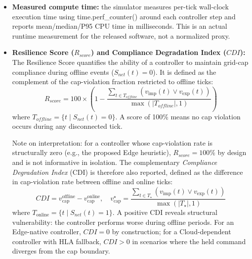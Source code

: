 \documentclass[preprint,12pt]{elsarticle}
\def\texttt#1{#1}%
\begin{document}
\begin{itemize}
\item \textbf{Measured compute time:} the simulator measures per-tick wall-clock execution time using \texttt{time.perf\_counter()} around each controller step and reports mean/median/P95 CPU time in milliseconds. This is an actual runtime measurement for the released software, not a normalized proxy.

\item \textbf{Resilience Score ($R_{score}$) and Compliance Degradation Index ($CDI$):}
The Resilience Score quantifies the ability of a controller to maintain grid-cap compliance during offline events ($S_{net}(t) = 0$). It is defined as the complement of the cap-violation fraction restricted to offline ticks:
\begin{equation}
R_{score} = 100 \times \left(1 - \frac{\sum_{t \in T_{offline}} (v_{\mathrm{imp}}(t) \lor v_{\mathrm{exp}}(t))}{\max(|T_{offline}|,1)}\right)
\label{eq:resilience_score}
\end{equation}
where $T_{offline} = \{t \mid S_{net}(t) = 0\}$. A score of 100\% means no cap violation occurs during any disconnected tick.

Note on interpretation: for a controller whose cap-violation rate is structurally zero (e.g., the proposed Edge heuristic), $R_{score}=100\%$ by design and is not informative in isolation. The complementary \emph{Compliance Degradation Index} (CDI) is therefore also reported, defined as the difference in cap-violation rate between offline and online ticks:
\begin{equation}
CDI = v_{\mathrm{cap}}^{\mathrm{offline}} - v_{\mathrm{cap}}^{\mathrm{online}},
\quad v_{\mathrm{cap}}^{\star} = \frac{\sum_{t\in T_{\star}} (v_{\mathrm{imp}}(t)\lor v_{\mathrm{exp}}(t))}{\max(|T_{\star}|,1)}
\label{eq:cdi}
\end{equation}
where $T_{\mathrm{online}}=\{t\mid S_{net}(t)=1\}$. A positive CDI reveals structural vulnerability: the controller performs worse during offline periods. For an Edge-native controller, $CDI=0$ by construction; for a Cloud-dependent controller with HLA fallback, $CDI > 0$ in scenarios where the held command diverges from the cap boundary.
\end{itemize}
\end{document}
